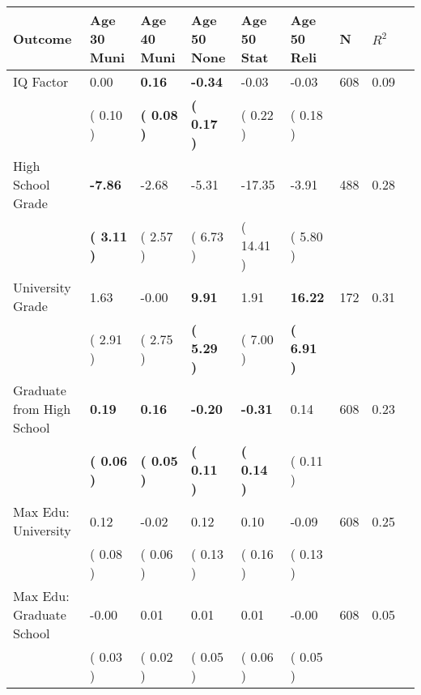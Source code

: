 \begin{tabular}{L{6.2cm} C{1.8cm} C{1.8cm} C{1.8cm} C{1.8cm} C{1.8cm} C{1.8cm} C{0.3cm} C{0.3cm}}
\toprule
 \textbf{Outcome} & \textbf{Age 30 Muni} & \textbf{Age 40 Muni} & \textbf{Age 50 None} & \textbf{Age 50 Stat} & \textbf{Age 50 Reli} & \textbf{N} & \textbf{$ R^2$} \\
\midrule
IQ Factor &      0.00 & \textbf{     0.16} & \textbf{    -0.34} &     -0.03 &     -0.03  & 608 &       0.09 \\ 
 & (     0.10 ) & \textbf{(     0.08 )} & \textbf{(     0.17 )} & (     0.22 ) & (     0.18 )  & \\
High School Grade & \textbf{    -7.86} &     -2.68 &     -5.31 &    -17.35 &     -3.91  & 488 &       0.28 \\ 
 & \textbf{(     3.11 )} & (     2.57 ) & (     6.73 ) & (    14.41 ) & (     5.80 )  & \\
University Grade &      1.63 &     -0.00 & \textbf{     9.91} &      1.91 & \textbf{    16.22}  & 172 &       0.31 \\ 
 & (     2.91 ) & (     2.75 ) & \textbf{(     5.29 )} & (     7.00 ) & \textbf{(     6.91 )}  & \\
Graduate from High School & \textbf{     0.19} & \textbf{     0.16} & \textbf{    -0.20} & \textbf{    -0.31} &      0.14  & 608 &       0.23 \\ 
 & \textbf{(     0.06 )} & \textbf{(     0.05 )} & \textbf{(     0.11 )} & \textbf{(     0.14 )} & (     0.11 )  & \\
Max Edu: University &      0.12 &     -0.02 &      0.12 &      0.10 &     -0.09  & 608 &       0.25 \\ 
 & (     0.08 ) & (     0.06 ) & (     0.13 ) & (     0.16 ) & (     0.13 )  & \\
Max Edu: Graduate School &     -0.00 &      0.01 &      0.01 &      0.01 &     -0.00  & 608 &       0.05 \\ 
 & (     0.03 ) & (     0.02 ) & (     0.05 ) & (     0.06 ) & (     0.05 )  & \\
\bottomrule
\end{tabular}
